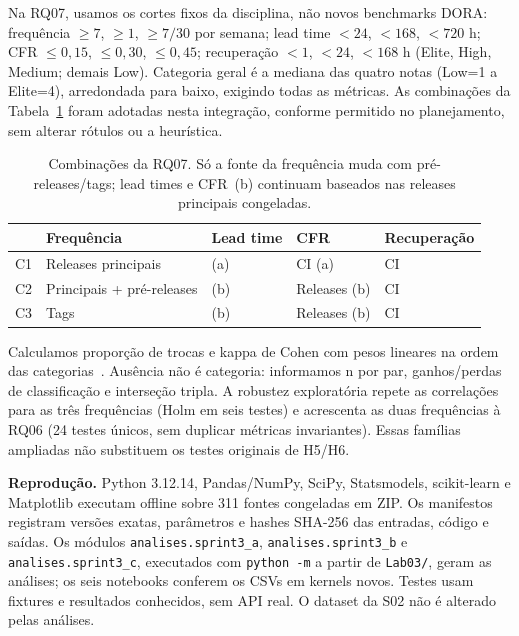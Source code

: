 Na RQ07, usamos os cortes fixos da disciplina, não novos benchmarks DORA:
frequência $\geq7$, $\geq1$, $\geq7/30$ por semana; lead time $<24$, $<168$,
$<720$ h; CFR $\leq0,15$, $\leq0,30$, $\leq0,45$; recuperação $<1$, $<24$,
$<168$ h (Elite, High, Medium; demais Low). Categoria geral é a mediana das quatro
notas (Low=1 a Elite=4), arredondada para baixo, exigindo todas as métricas.
As combinações da Tabela~\ref{tab:combinacoes} foram adotadas nesta integração,
conforme permitido no planejamento, sem alterar rótulos ou a heurística.

\begin{table}[htbp]
\centering\footnotesize
\caption{Combinações da RQ07. Só a fonte da frequência muda com pré-releases/tags;
lead times e CFR~(b) continuam baseados nas releases principais congeladas.}
\label{tab:combinacoes}
\begin{tabular}{lllll}
\hline
 & Frequência & Lead time & CFR & Recuperação \\
\hline
C1 & Releases principais & (a) & CI (a) & CI \\
C2 & Principais + pré-releases & (b) & Releases (b) & CI \\
C3 & Tags & (b) & Releases (b) & CI \\
\hline
\end{tabular}
\end{table}

Calculamos proporção de trocas e kappa de Cohen com pesos lineares na ordem das
categorias~\cite{sklearnKappa}. Ausência não é categoria: informamos n por par,
ganhos/perdas de classificação e interseção tripla. A robustez exploratória repete
as correlações para as três frequências (Holm em seis testes) e acrescenta as duas
frequências à RQ06 (24 testes únicos, sem duplicar métricas invariantes).
Essas famílias ampliadas não substituem os testes originais de H5/H6.

\textbf{Reprodução.} Python 3.12.14, Pandas/NumPy, SciPy, Statsmodels,
scikit-learn e Matplotlib executam offline sobre 311 fontes congeladas em ZIP.
Os manifestos registram versões exatas, parâmetros e hashes SHA-256 das entradas,
código e saídas. Os módulos \texttt{analises.sprint3\_a},
\texttt{analises.sprint3\_b} e \texttt{analises.sprint3\_c}, executados com
\texttt{python -m} a partir de \texttt{Lab03/}, geram as análises; os seis notebooks
conferem os CSVs em kernels novos. Testes usam fixtures
e resultados conhecidos, sem API real. O dataset da S02 não é alterado pelas análises.
